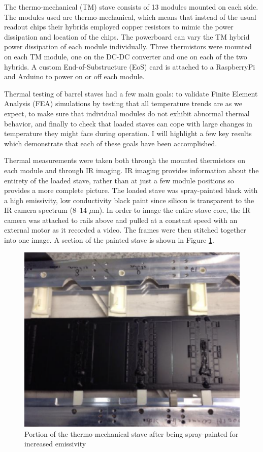 The thermo-mechanical (TM) stave consists of 13 modules mounted on each side. The modules used are thermo-mechanical, which means that instead of the usual readout chips their hybrids employed copper resistors to mimic the power dissipation and location of the chips. The powerboard can vary the TM hybrid power dissipation of each module individually. Three thermistors were mounted on each TM module, one on the DC-DC converter and one on each of the two hybrids. A custom End-of-Substructure (EoS) card is attached to a RaspberryPi and Arduino to power on or off each module.  
 
Thermal testing of barrel staves had a few main goals: to validate Finite Element Analysis (FEA) simulations by testing that all temperature trends are as we expect, to make sure that individual modules do not exhibit abnormal thermal behavior, and finally to check that loaded staves can cope with large changes in temperature they might face during operation. I will highlight a few key results which demonstrate that each of these goals have been accomplished. 

Thermal measurements were taken both through the mounted thermistors on each module and through IR imaging. IR imaging provides information about the entirety of the loaded stave, rather than at just a few module positions so provides a more complete picture. The loaded stave was spray-painted black with a high emissivity, low conductivity black paint since silicon is transparent to the IR camera spectrum (8--14 $\mu$m). In order to image the entire stave core, the IR camera was attached to rails above and pulled at a constant speed with an external motor as it recorded a video. The frames were then stitched together into one image. A section of the painted stave is shown in Figure \ref{fig:paintedstave}.  

\begin{figure}[!h]
        \centering
    \includegraphics[width=.4\textwidth]{Pictures/paintedstave.png}
    \caption{Portion of the thermo-mechanical stave after being spray-painted for increased emissivity}
    \label{fig:paintedstave}
\end{figure}

